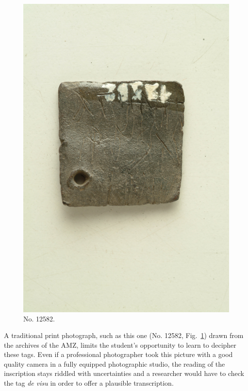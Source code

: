 \documentclass[amsthm,ebook]{saparticle}
\begin{document}
\begin{figure}[!h]
\includegraphics[scale=0.25]{EAGLE16lameetalteaching-img002.jpg}
\caption{No. 12582.}
\label{fig:12582}
\end{figure}

A traditional print photograph, such as this one (No. 12582, Fig.~\ref{fig:12582}) drawn from the archives of the AMZ, limits the student’s
opportunity to learn to decipher these tags. Even if a professional photographer took this picture with a good quality
camera in a fully equipped photographic studio, the reading of the inscription stays riddled with uncertainties and a
researcher would have to check the tag \emph{de visu} in order to offer a plausible transcription.
\end{document}
